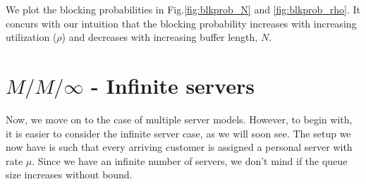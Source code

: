 \documentclass[11pt, a4paper]{report}
\begin{document}
We plot the blocking probabilities in Fig.\ref{fig:blkprob_N} and \ref{fig:blkprob_rho}. It concurs with our intuition that the blocking probability increases with increasing utilization ($\rho$) and decreases with increasing buffer length, $N$.

\section{$M/M/\infty$ - Infinite servers}

Now, we move on to the case of multiple server models. However, to begin with, it is easier to consider the infinite server case, as we will soon see. The setup we now have is such that every arriving customer is assigned a personal server with rate $\mu$. Since we have an infinite number of servers, we don't mind if the queue size increases without bound.
\end{document}
